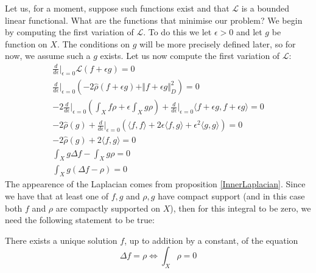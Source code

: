 \documentclass[11pt]{report}
\theoremstyle{definition}
\begin{document}
Let us, for a moment, suppose such functions exist and that $\mathcal{L}$ is a bounded linear functional. What are the functions that minimise our problem?
We begin by computing the first variation of $\mathcal{L}$. To do this we let $\epsilon > 0$ and let $g$ be function on $X$. The conditions on $g$ will be more precisely defined later, so for now, we assume such a $g$ exists. Let us now compute the first variation of $\mathcal{L}$:
\begin{gather*}
  \frac{d}{d\epsilon}\biggr\rvert_{\epsilon = 0}\mathcal{L}(f+\epsilon g) = 0 \\
  \frac{d}{d\epsilon}\biggr\rvert_{\epsilon = 0}(-2\hat{\rho}(f+\epsilon g) + \Vert f+\epsilon g\Vert _D^2) = 0 \\
  -2\frac{d}{d\epsilon}\biggr\rvert_{\epsilon = 0}(\int_X f\rho  + \epsilon \int_X g\rho) + \frac{d}{d\epsilon}\biggr\rvert_{\epsilon = 0} \langle f + \epsilon g, f + \epsilon g \rangle = 0 \\
  -2\hat{\rho}(g)+\frac{d}{d\epsilon}\biggr\rvert_{\epsilon = 0}(\langle f, f \rangle + 2\epsilon \langle f, g \rangle +\epsilon^2 \langle g, g \rangle) = 0 \\
  -2\hat{\rho}(g) + 2\langle f, g \rangle = 0 \\
  \int_X g\Delta f - \int_X g\rho = 0 \\
  \int_X g(\Delta f - \rho) = 0 
\end{gather*}
The appearence of the Laplacian comes from proposition \ref{InnerLaplacian}.
Since we have that at least one of $f,g$ and $\rho,g$ have compact support (and in this case both $f$ and $\rho$ are compactly supported on $X$), then for this integral to be zero, we need the following statement to be true:

There exists a unique solution $f$, up to addition by a constant, of the equation 
\[ \Delta f = \rho \Longleftrightarrow \int_X \rho = 0\]
\end{document}
